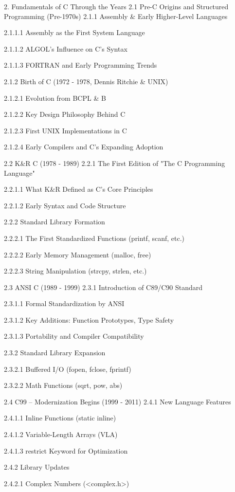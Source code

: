 2. Fundamentals of C Through the Years
2.1 Pre-C Origins and Structured Programming (Pre-1970s)
2.1.1 Assembly & Early Higher-Level Languages

2.1.1.1 Assembly as the First System Language

2.1.1.2 ALGOL’s Influence on C’s Syntax

2.1.1.3 FORTRAN and Early Programming Trends

2.1.2 Birth of C (1972 - 1978, Dennis Ritchie & UNIX)

2.1.2.1 Evolution from BCPL & B

2.1.2.2 Key Design Philosophy Behind C

2.1.2.3 First UNIX Implementations in C

2.1.2.4 Early Compilers and C’s Expanding Adoption

2.2 K&R C (1978 - 1989)
2.2.1 The First Edition of "The C Programming Language"

2.2.1.1 What K&R Defined as C’s Core Principles

2.2.1.2 Early Syntax and Code Structure

2.2.2 Standard Library Formation

2.2.2.1 The First Standardized Functions (printf, scanf, etc.)

2.2.2.2 Early Memory Management (malloc, free)

2.2.2.3 String Manipulation (strcpy, strlen, etc.)

2.3 ANSI C (1989 - 1999)
2.3.1 Introduction of C89/C90 Standard

2.3.1.1 Formal Standardization by ANSI

2.3.1.2 Key Additions: Function Prototypes, Type Safety

2.3.1.3 Portability and Compiler Compatibility

2.3.2 Standard Library Expansion

2.3.2.1 Buffered I/O (fopen, fclose, fprintf)

2.3.2.2 Math Functions (sqrt, pow, abs)

2.4 C99 – Modernization Begins (1999 - 2011)
2.4.1 New Language Features

2.4.1.1 Inline Functions (static inline)

2.4.1.2 Variable-Length Arrays (VLA)

2.4.1.3 restrict Keyword for Optimization

2.4.2 Library Updates

2.4.2.1 Complex Numbers (<complex.h>)


